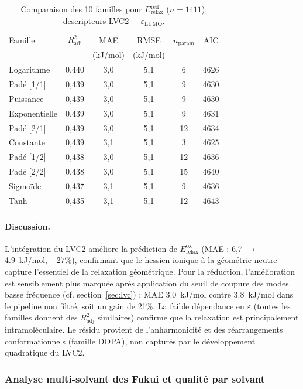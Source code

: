 \begin{table}[htbp]
\centering
\footnotesize
\caption{Comparaison des 10 familles pour $E_{\mathrm{relax}}^{\mathrm{red}}$ ($n = 1411$), descripteurs LVC2 + $\varepsilon_\text{LUMO}$.}
\label{tab:s4_erelax_red_families}
\begin{tabular}{lccccc}
\toprule
Famille & $R^2_{\mathrm{adj}}$ & MAE & RMSE & $n_{\mathrm{param}}$ & AIC \\
 & & (kJ/mol) & (kJ/mol) & & \\
\midrule
Logarithme & 0,440 & 3,0 & 5,1 & 6 & 4626 \\
Padé [1/1] & 0,439 & 3,0 & 5,1 & 9 & 4630 \\
Puissance & 0,439 & 3,0 & 5,1 & 9 & 4630 \\
Exponentielle & 0,439 & 3,0 & 5,1 & 9 & 4631 \\
Padé [2/1] & 0,439 & 3,0 & 5,1 & 12 & 4634 \\
Constante & 0,439 & 3,1 & 5,1 & 3 & 4625 \\
Padé [1/2] & 0,438 & 3,0 & 5,1 & 12 & 4636 \\
Padé [2/2] & 0,438 & 3,0 & 5,1 & 15 & 4640 \\
Sigmoïde & 0,437 & 3,1 & 5,1 & 9 & 4636 \\
Tanh & 0,435 & 3,1 & 5,1 & 12 & 4643 \\
\bottomrule
\end{tabular}
\end{table}

\paragraph{Discussion.}
L'intégration du LVC2 améliore la prédiction de $E_\text{relax}^\text{ox}$ (MAE : 6,7 $\to$ \SI{4.9}{kJ/mol}, $-27\%$), confirmant que le hessien ionique à la géométrie neutre capture l'essentiel de la relaxation géométrique. Pour la réduction, l'amélioration est sensiblement plus marquée après application du seuil de coupure des modes basse fréquence (cf. section~\ref{sec:lvc}) : MAE \SI{3.0}{kJ/mol} contre \SI{3.8}{kJ/mol} dans le pipeline non filtré, soit un gain de 21\%. La faible dépendance en $\varepsilon$ (toutes les familles donnent des $R^2_\text{adj}$ similaires) confirme que la relaxation est principalement intramoléculaire. Le résidu provient de l'anharmonicité et des réarrangements conformationnels (famille DOPA), non capturés par le développement quadratique du LVC2.

\subsubsection{Analyse multi-solvant des Fukui et qualité par solvant}
\label{subsubsec:s42_fukui_multisolv}

